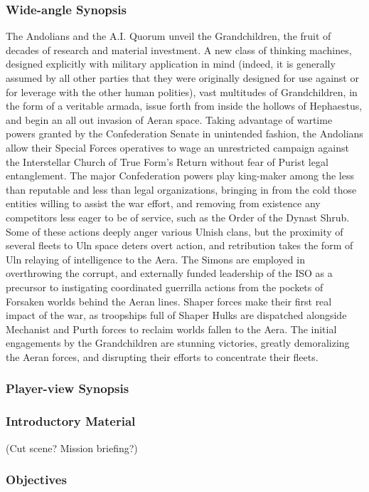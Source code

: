 \subsubsection{Wide-angle Synopsis}
The Andolians and the A.I. Quorum unveil the Grandchildren, the fruit
of decades of research and material investment. A new class of
thinking machines, designed explicitly with military application in
mind (indeed, it is generally assumed by all other parties that they
were originally designed for use against or for leverage with the
other human polities), vast multitudes of Grandchildren, in the form
of a veritable armada, issue forth from inside the hollows of
Hephaestus, and begin an all out invasion of Aeran space. Taking
advantage of wartime powers granted by the Confederation Senate in
unintended fashion, the Andolians allow their Special Forces
operatives to wage an unrestricted campaign against the Interstellar
Church of True Form's Return without fear of Purist legal
entanglement. The major Confederation powers play king-maker among the
less than reputable and less than legal organizations, bringing in
from the cold those entities willing to assist the war effort, and
removing from existence any competitors less eager to be of service,
such as the Order of the Dynast Shrub. Some of these actions deeply
anger various Ulnish clans, but the proximity of several fleets to Uln
space deters overt action, and retribution takes the form of Uln
relaying of intelligence to the Aera. The Simons are employed in
overthrowing the corrupt, and externally funded leadership of the ISO
as a precursor to instigating coordinated guerrilla actions from the
pockets of Forsaken worlds behind the Aeran lines. Shaper forces make
their first real impact of the war, as troopships full of Shaper Hulks
are dispatched alongside Mechanist and Purth forces to reclaim worlds
fallen to the Aera. The initial engagements by the Grandchildren are
stunning victories, greatly demoralizing the Aeran forces, and
disrupting their efforts to concentrate their fleets.
\subsubsection{Player-view Synopsis}
\subsubsection{Introductory Material}
 (Cut scene?  Mission briefing?)
\subsubsection{Objectives}
